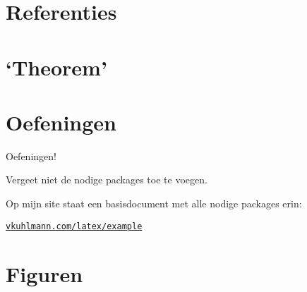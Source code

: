 \documentclass[
    dutch,
    everyoneauthor=true,
    darktheme,
    defaultSlideCollection=vincent,
    handout
]{../../cursuspresentatie}
\let\placetarget\relax
\let\placetarget\relax
\begin{document}


\section{Referenties}\label{sec:referenties}

\def\placetarget{\hypertarget{referenties}{}}


\section{`Theorem'}\label{sec:theorem}

\def\placetarget{\hypertarget{theorem}{}}


\section{Oefeningen}\label{sec:oefeningen1}

\def\placetarget{\hypertarget{oefeningen1}{}}

\begin{frame}
    \begin{center}
        {\LARGE Oefeningen!}
        \vspace{30pt}

        Vergeet niet de nodige packages toe te voegen.
        
        Op mijn site
        staat een basisdocument met alle nodige packages erin:

        \href{https://vkuhlmann.com/latex/example}{\nolinkurl{vkuhlmann.com/latex/example}}
    \end{center}
\end{frame}



\section{Figuren}\label{sec:figuren}
\end{document}
